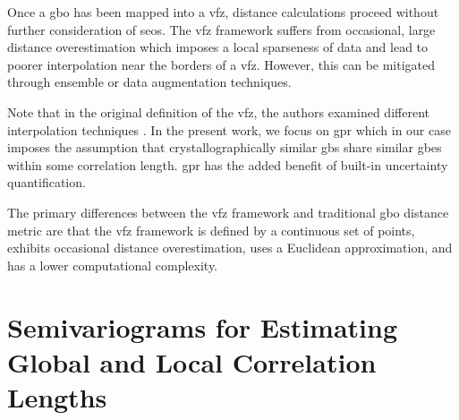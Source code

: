 \documentclass[preprint,12pt]{elsarticle}
\begin{document}
    Once a \gls{gbo} has been mapped into a \gls{vfz}, distance calculations proceed without further consideration of \glspl{seo}. The \gls{vfz} framework suffers from occasional, large distance overestimation which imposes a local sparseness of data and lead to poorer interpolation near the borders of a \gls{vfz}. However, this can be mitigated through ensemble or data augmentation techniques.
    
    Note that in the original definition of the \gls{vfz}, the authors examined different interpolation techniques \cite{bairdFiveDegreeofFreedomPropertyUnderReview}. In the present work, we focus on \gls{gpr} which in our case imposes the assumption that crystallographically similar \glspl{gb} share similar \glspl{gbe} within some correlation length. \Gls{gpr} has the added benefit of built-in uncertainty quantification.
    
    The primary differences between the \gls{vfz} framework and traditional \gls{gbo} distance metric are that the \gls{vfz} framework is defined by a continuous set of points, exhibits occasional distance overestimation, uses a Euclidean approximation, and has a lower computational complexity.


    


\section{Semivariograms for Estimating Global and Local Correlation Lengths} \label{sec:supp:semivariogram}
\end{document}
